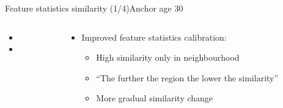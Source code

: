 \begin{frame}{Feature statistics similarity (1/4)}{Anchor age 30}
\begin{columns}
\begin{column}{0.5\textwidth}
\begin{itemize}
				\item {}
				\item {}
			\end{itemize}
		\end{column}
		\begin{column}{0.5\textwidth}
			\begin{itemize}
				\item Improved feature statistics calibration:
				\begin{itemize}
					\vspace{-1.5em}
					\scriptsize
					\item High similarity only in neighbourhood
					\item ``The further the region the lower the similarity''
					\item More gradual similarity change
				\end{itemize}
			\end{itemize}
		\end{column}
	\end{columns}
\end{frame}

